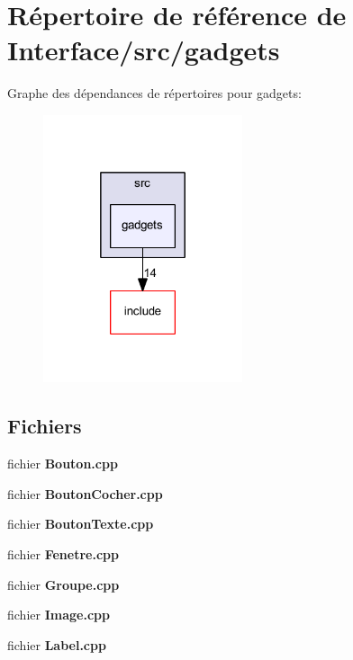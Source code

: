 \section{Répertoire de référence de Interface/src/gadgets}
\label{dir_3d88379f6553b92be3ae4ff299dd8595}
Graphe des dépendances de répertoires pour gadgets\+:\nopagebreak
\begin{figure}[H]
\begin{center}
\leavevmode
\includegraphics[width=166pt]{dir_3d88379f6553b92be3ae4ff299dd8595_dep}
\end{center}
\end{figure}
\subsection*{Fichiers}
\begin{DoxyCompactItemize}
\item 
fichier {\bf Bouton.\+cpp}
\item 
fichier {\bf Bouton\+Cocher.\+cpp}
\item 
fichier {\bf Bouton\+Texte.\+cpp}
\item 
fichier {\bf Fenetre.\+cpp}
\item 
fichier {\bf Groupe.\+cpp}
\item 
fichier {\bf Image.\+cpp}
\item 
fichier {\bf Label.\+cpp}
\end{DoxyCompactItemize}
